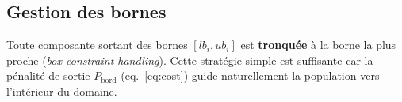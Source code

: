 \subsection{Gestion des bornes}

Toute composante sortant des bornes $[lb_i, ub_i]$ est \textbf{tronquée} à la
borne la plus proche (\emph{box constraint handling}).  Cette stratégie simple
est suffisante car la pénalité de sortie $P_{\text{bord}}$ (eq.~\ref{eq:cost})
guide naturellement la population vers l'intérieur du domaine.
